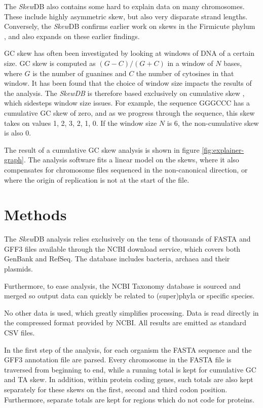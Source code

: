 \documentclass[fleqn,10pt]{wlscirep}
\begin{document}
The \emph{Skew}DB also contains some hard to explain data on many chromosomes. These include highly asymmetric skew, but also very disparate strand lengths. Conversely, the \emph{Skew}DB confirms earlier work on skews in the Firmicute phylum  \cite{charneski_atypical_2011}, and also expands on these earlier findings.

GC skew has often been investigated by looking at windows of DNA of a certain size. GC skew is computed as $(G-C)/(G+C)$ in a window of $N$ bases, where $G$ is the number of guanines and $C$ the number of cytosines in that window. It has been found that the choice of window size impacts the results of the analysis. The \emph{SkewDB} is therefore based exclusively on cumulative skew \cite{grigoriev_analyzing_1998}, which sidesteps window size issues. For example, the sequence GGGCCC has a cumulative GC skew of zero, and as we progress through the sequence, this skew takes on values 1, 2, 3, 2, 1, 0. If the window size $N$ is 6, the non-cumulative skew is also 0. 

The result of a cumulative GC skew analysis is shown in figure \ref{fig:explainer-graph}. The analysis software fits a linear model on the skews, where it also compensates for chromosome files sequenced in the non-canonical direction, or where the origin of replication is not at the start of the file.

\section*{Methods}
The \emph{Skew}DB analysis relies exclusively on the tens of thousands of FASTA and GFF3 files available through the NCBI download service, which covers both GenBank and RefSeq. The database includes bacteria, archaea and their plasmids.

Furthermore, to ease analysis, the NCBI Taxonomy database is sourced and merged so output data can quickly be related to (super)phyla or specific species.

No other data is used, which greatly simplifies processing. Data is read directly in the compressed format provided by NCBI. All results are emitted as standard CSV files.

In the first step of the analysis, for each organism the FASTA sequence and the GFF3 annotation file are parsed. Every chromosome in the FASTA file is traversed from beginning to end, while a running total is kept for cumulative GC and TA skew. In addition, within protein coding genes, such totals are also kept separately for these skews on the first, second and third codon position. Furthermore, separate totals are kept for regions which do not code for proteins.
\end{document}
